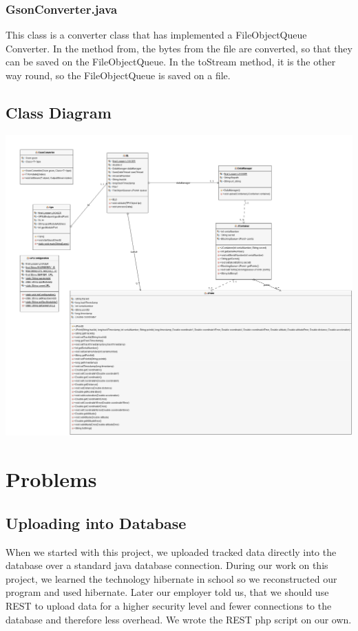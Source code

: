 \subsubsection{GsonConverter.java}
This class is a converter class that has implemented a FileObjectQueue Converter. In the method from, the bytes from the file are converted, so that they can be saved on the FileObjectQueue. In the toStream method, it is the other way round, so the FileObjectQueue is saved on a file.
\subsection{Class Diagram}
\begin{center}
\includegraphics[width=1\textwidth]{GPS_REST_UML_Diagram}
\end{center}
\section{Problems}
\subsection{Uploading into Database}
When we started with this project, we uploaded tracked data directly into the database over a standard java database connection. During our work on this project, we learned the technology hibernate in school so we reconstructed our program and used hibernate. Later our employer told us, that we should use REST to upload data for a higher security level and fewer connections to the database and therefore less overhead. We wrote the REST php script on our own. 
